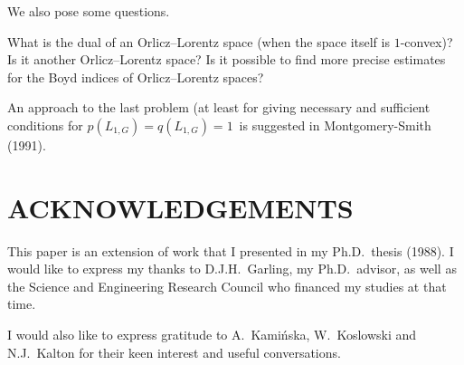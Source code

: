 We also pose some questions.
\begin{itemrom}
\itemi What is the dual of an Orlicz--Lorentz space (when the space itself
is $1$-convex)? Is it another Orlicz--Lorentz space?
\itemii Is it possible to find more precise estimates for the Boyd indices of
Orlicz--Lorentz spaces?
\end{itemrom}
An approach to the last problem 
(at least for giving necessary and sufficient conditions for $p(L_{1,G}) =
q(L_{1,G}) = 1$\ is suggested in Montgomery-Smith (1991).

\section*{ACKNOWLEDGEMENTS}

This paper is an extension of work that I presented in my Ph.D.\ thesis
(1988). I would like to express my thanks to D.J.H.~Garling, my Ph.D.\
advisor, as well as the Science and Engineering Research Council who 
financed my
studies at that time.

I would also like to express gratitude to A.~Kami\'nska, W.~Koslowski and
N.J.~Kalton for their keen interest and useful conversations.

